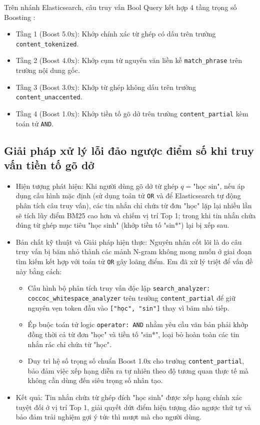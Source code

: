 \documentclass[12pt,a4paper,oneside]{report}
\begin{document}
Trên nhánh Elasticsearch, câu truy vấn Bool Query kết hợp 4 tầng trọng số Boosting \cite{ref4}:
\begin{itemize}
    \item Tầng 1 (Boost 5.0x): Khớp chính xác từ ghép có dấu trên trường \texttt{content\_tokenized}.
    \item Tầng 2 (Boost 4.0x): Khớp cụm từ nguyên văn liền kề \texttt{match\_phrase} trên trường nội dung gốc.
    \item Tầng 3 (Boost 3.0x): Khớp từ ghép không dấu trên trường \texttt{content\_unaccented}.
    \item Tầng 4 (Boost 1.0x): Khớp tiền tố gõ dở trên trường \texttt{content\_partial} kèm toán tử \texttt{AND}.
\end{itemize}

\subsection{Giải pháp xử lý lỗi đảo ngược điểm số khi truy vấn tiền tố gõ dở}
\begin{itemize}
    \item Hiện tượng phát hiện: Khi người dùng gõ dở từ ghép $q = \text{"học sin"}$, nếu áp dụng cấu hình mặc định (sử dụng toán tử \texttt{OR} và để Elasticsearch tự động phân tích câu truy vấn), các tin nhắn chỉ chứa từ đơn "học" lặp lại nhiều lần sẽ tích lũy điểm BM25 cao hơn và chiếm vị trí Top 1; trong khi tin nhắn chứa đúng từ ghép mục tiêu "học sinh" (khớp tiền tố "sin*") lại bị xếp sau.
    \item Bản chất kỹ thuật và Giải pháp hiện thực: Nguyên nhân cốt lõi là do câu truy vấn bị băm nhỏ thành các mảnh N-gram không mong muốn ở giai đoạn tìm kiếm kết hợp với toán tử \texttt{OR} gây loãng điểm. Em đã xử lý triệt để vấn đề này bằng cách:
    \begin{itemize}
        \item Cấu hình bộ phân tích truy vấn độc lập \texttt{search\_analyzer: coccoc\_whitespace\_analyzer} trên trường \texttt{content\_partial} để giữ nguyên vẹn token đầu vào \texttt{["học", "sin"]} thay vì băm nhỏ tiếp.
        \item Ép buộc toán tử logic \texttt{operator: AND} nhằm yêu cầu văn bản phải khớp đồng thời cả từ đơn "học" và tiền tố "sin*", loại bỏ hoàn toàn các tin nhắn rác chỉ chứa từ "học".
        \item Duy trì hệ số trọng số chuẩn Boost 1.0x cho trường \texttt{content\_partial}, bảo đảm việc xếp hạng diễn ra tự nhiên theo độ tương quan thực tế mà không cần dùng đến siêu trọng số nhân tạo.
    \end{itemize}
    \item Kết quả: Tin nhắn chứa từ ghép đích "học sinh" được xếp hạng chính xác tuyệt đối ở vị trí Top 1, giải quyết dứt điểm hiện tượng đảo ngược thứ tự và bảo đảm trải nghiệm gợi ý tức thì mượt mà cho người dùng.
\end{itemize}
\end{document}
